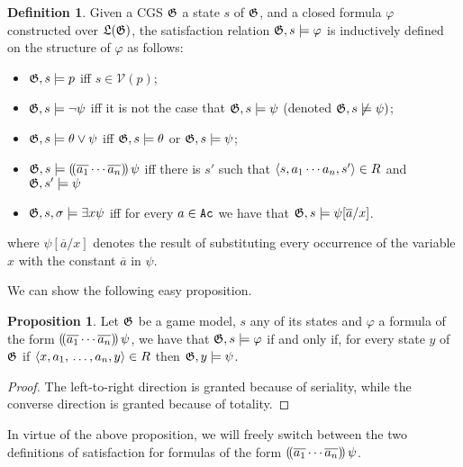 \documentclass{article}
\theoremstyle{definition}
\newtheorem{definition}{Definition}[section]
\newtheorem{proposition}{Proposition}
\begin{document}
\begin{definition}
Given a CGS $\mathfrak{G}$ a state $s$ of $\mathfrak{G}$, and a closed  formula $\varphi$ constructed over $\mathfrak{L}(\mathfrak{G})$, the  satisfaction relation $\mathfrak{G},s\models \varphi$ is inductively defined on the structure of $\varphi$ as follows: 
    \begin{itemize}
    \item $\mathfrak{G},s\models p$ iff $s\in \mathcal{V}(p)$; 
    \item $\mathfrak{G},s \models \neg \psi$ iff it is not the case that $\mathfrak{G},s \models \psi$ (denoted $\mathfrak{G},s\not\models \psi)$; 
    \item $\mathfrak{G},s\models \theta \vee\psi $ iff $\mathfrak{G},s \models \theta$ or $\mathfrak{G},s \models \psi$;
    \item $\mathfrak{G},s \models (\!(     \overline{a_1}\cdots \overline{a_n} )\!)\, \psi $ iff there is $s'$ such that $\langle s, {a_1}\cdots {a_n},s' \rangle\in R$ and $\mathfrak{G},s'\models  \psi $ 
    
    \item $\mathfrak{G},s,\sigma \models \exists x \psi$ iff for every   $a \in \texttt{Ac}$ we have that $\mathfrak{G},s \models \psi[\overline{a}/x]$.
    
\end{itemize}


\noindent where $\psi[\overline{a}/x]$ denotes the result of substituting every occurrence of the variable $x$ with the constant $\overline{a}$ in $\psi$.  
    
\end{definition}


We can show the following easy proposition. 

\begin{proposition}
    Let $\mathfrak{G}$ be a game model, $s$ any of its states and $\varphi$ a formula of the form $(\!( \overline{a_1}\cdots \overline{a_n} )\!)\, \psi$, we have that $\mathfrak{G},s \models \varphi$ if and only if, for every state $y$ of $\mathfrak{G}$ if $\langle x,a_1,\,\ldots, a_n,y \rangle\in R$ then $\mathfrak{G},y\models \psi$. 
    
     \end{proposition}
   \begin{proof}
       The left-to-right direction is granted because of seriality, while the converse direction is granted because of  totality. 
   \end{proof}

   In virtue of the above proposition, we will freely switch between the two definitions of satisfaction for formulas of the form  $(\!( \overline{a_1}\cdots \overline{a_n} )\!)\, \psi$. 
\end{document}
